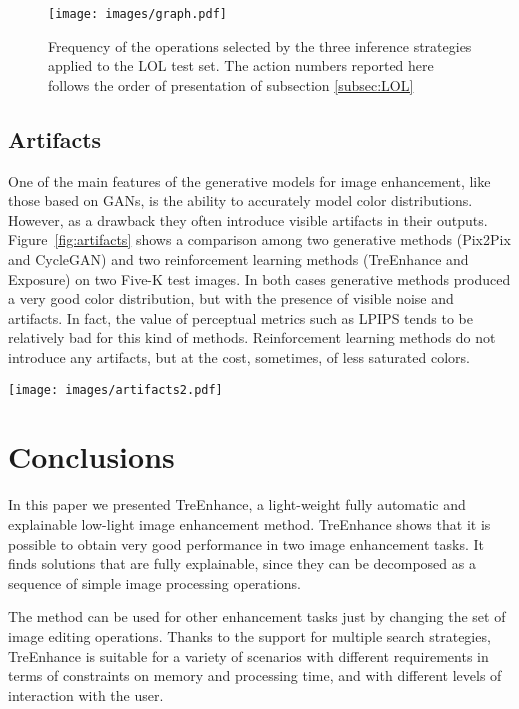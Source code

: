 \documentclass[3p,twocolumn]{elsarticle}
\newcommand{\method}[0]{TreEnhance}
\begin{document}
\begin{figure}
    \centering
    \texttt{[image: images/graph.pdf]}
    \caption{Frequency of the operations selected by the three inference strategies applied to the LOL test set. The action numbers reported here follows the order of presentation of subsection \ref{subsec:LOL}}
    \label{fig:seq_analysis}
\end{figure}

\subsection{Artifacts}
\label{sec:artif}
One of the main features of the generative models for image enhancement, like those based on GANs, is the ability to accurately model color distributions.
However, as a drawback they often introduce visible artifacts in their outputs.
Figure~\ref{fig:artifacts} shows a comparison among two generative methods (Pix2Pix and CycleGAN) and two reinforcement learning methods (\method{} and Exposure) on two Five-K test images.  In both cases generative methods produced a very good color distribution, but with the presence of visible noise and artifacts.  In fact, the value of perceptual metrics such as LPIPS tends to be relatively bad for this kind of methods. Reinforcement learning methods do not introduce any artifacts, but at the cost, sometimes, of less saturated colors.

\begin{figure*}[h]
    \centering
    \texttt{[image: images/artifacts2.pdf]}
    \caption{Comparison of generative and reinforcement learning methods on two Five-K test images.}
    \label{fig:artifacts}
\end{figure*}

\section{Conclusions}
\label{sec:concl}

In this paper we presented \method{}, a light-weight fully automatic and explainable low-light image enhancement method. \method{} shows that it is possible to obtain very good performance in two image enhancement tasks.  It finds solutions that are fully explainable, since they can be decomposed as a sequence of simple image processing operations.

The method can be used for other enhancement tasks just by changing the set of image editing operations.  Thanks to the support for multiple search strategies, \method{} is suitable for a variety of scenarios with different requirements in terms of constraints on memory and processing time, and with different levels of interaction with the user.
\end{document}
